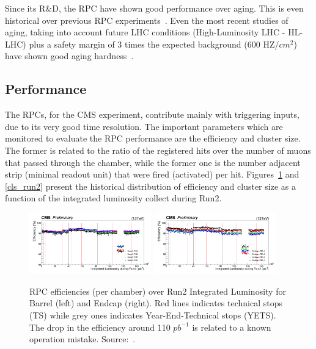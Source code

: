 Since its R\&D, the RPC have shown good performance over aging. This is even historical over previous RPC experiments~\cite{Bressi:1987kg,Ge:2014tea,Abbrescia:1993xy,Antoniazzi:1992dg,DiCiaccio:1992di,deAsmundis:1995dq,Boutigny:1995ib}. Even the most recent studies of aging, taking into account future LHC conditions (High-Luminosity LHC - HL-LHC) plus a safety margin of 3 times the expected background (600 HZ/$cm^2$) have shown good aging hardness~\cite{andrea_rpc_2018}.

\subsection{Performance}

The RPCs, for the CMS experiment, contribute mainly with triggering inputs, due to its very good time resolution. The important parameters which are monitored to evaluate the RPC performance are the efficiency and cluster size. The former is related to the ratio of the registered hits over the number of muons that passed through the chamber, while the former one is the number adjacent strip (minimal readout unit) that were fired (activated) per hit. Figures~\ref{eff_run2} and \ref{cls_run2} present the historical distribution of efficiency and cluster size as a function of the integrated luminosity collect during Run2.

\begin{figure}[htbp]
    \centering
    \includegraphics[width=0.47\textwidth,keepaspectratio]{figures/rpc/performance/barrel_eff_vs_intL.png}
    \includegraphics[width=0.47\textwidth,keepaspectratio]{figures/rpc/performance/endcap_eff_vs_intL.png}
    \caption{RPC efficiencies (per chamber) over Run2 Integrated Luminosity for Barrel (left) and Endcap (right). Red lines indicates technical stops (TS) while grey ones indicates Year-End-Technical stops (YETS). The drop in the efficiency around 110 $pb^{-1}$ is related to a known operation mistake. Source:~\cite{rpc_run2_performance}.}
    \label{eff_run2}
\end{figure}


